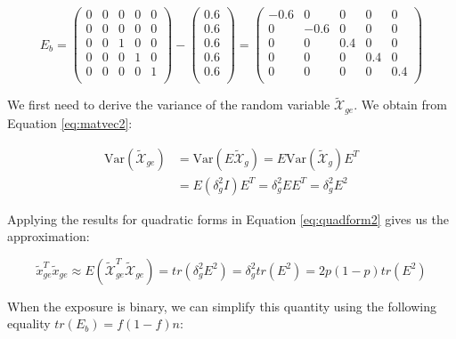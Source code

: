 \documentclass[]{book}
\begin{document}
\begin{equation*} 
E_b = 
\left(\begin{array}{ccccc}
0 & 0 & 0 & 0 & 0\\
0 & 0 & 0 & 0 & 0\\
0 & 0 & 1 & 0 & 0\\
0 & 0 & 0 & 1 & 0\\
0 & 0 & 0 & 0 & 1\\
\end{array}\right)
- 
\left(\begin{array}{c}
0.6 \\
0.6 \\
0.6 \\
0.6 \\
0.6 \\
\end{array}\right)
= 
\left(\begin{array}{ccccc}
-0.6 & 0 & 0 & 0 & 0\\
0 & -0.6 & 0 & 0 & 0\\
0 & 0 & 0.4 & 0 & 0\\
0 & 0 & 0 & 0.4 & 0\\
0 & 0 & 0 & 0 & 0.4\\
\end{array}\right)
\end{equation*}

We first need to derive the variance of the random variable
\(\mathcal{\tilde{X}}_{ge}\). We obtain from Equation \eqref{eq:matvec2}:

\begin{equation}
\begin{split}
\mathrm{Var}(\mathcal{\tilde{X}}_{ge}) & = \mathrm{Var}(E \mathcal{\tilde{X}}_g) = E \mathrm{Var}(\mathcal{\tilde{X}}_g) E^T \\
 & = E (\delta_g^2 I) E^T = \delta_g^2 E E^T = \delta_g^2 E^2 
\end{split}
\label{eq:xgevar}
\end{equation}

Applying the results for quadratic forms in Equation \eqref{eq:quadform2}
gives us the approximation:

\begin{equation}
\tilde{x}_{ge}^T \tilde{x}_{ge} \approx E(\mathcal{\tilde{X}}_{ge}^T \mathcal{\tilde{X}}_{ge}) = tr(\delta_g^2 E^2) = \delta_g^2 tr(E^2) = 2 p (1 - p) tr(E^2)
\label{eq:varbetahatlmg}
\end{equation}

When the exposure is binary, we can simplify this quantity using the
following equality \(tr(E_b) = f (1 - f) n\):
\end{document}
